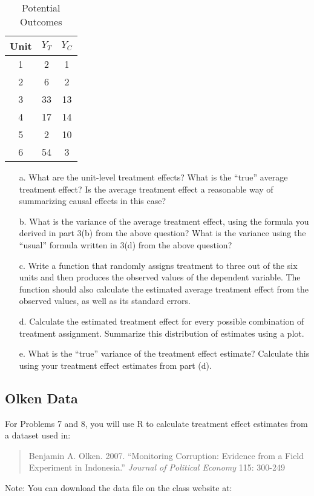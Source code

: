 \documentclass{article}
\begin{document}
\begin{table}[!h]
		\caption{Potential Outcomes}
	\begin{center}
		\begin{tabular}{ccc}
			Unit & $Y_T$ & $Y_C$ \\ \hline  
			1    & 2     & 1     \\ 
			2    & 6     & 2     \\ 
			3    & 33    & 13    \\ 
			4    & 17    & 14    \\ 
			5   &  2     &  10     \\ 
			 6  & 54    &  3 \\     
		\end{tabular}
		\label{}
	\end{center}
\end{table}


\begin{itemize}
\item[a.] What are the unit-level treatment effects? What is the ``true''
  average treatment effect? Is the average treatment effect a reasonable way
  of summarizing causal effects in this case? 
\item[b.]   What is the variance of the average treatment effect, using
  the formula you derived in part 3(b) from the above question? What is
  the variance using the ``usual'' formula written in 3(d) from the
  above question?
  \item[c.] Write a function that randomly assigns treatment to three out of
  the six units and then  produces the observed values of the dependent
  variable. The function should also calculate the estimated average
  treatment effect from the observed values, as well as its standard
  errors.
\item[d.] Calculate the estimated treatment effect for
  every possible combination of treatment assignment. Summarize this distribution of estimates using a plot.
\item[e.] What is the ``true'' variance of the treatment effect estimate? Calculate this using your treatment effect estimates from part (d).
\end{itemize}

\subsection*{Olken Data}
For Problems 7 and 8, you will use R to calculate
treatment effect estimates from a dataset used in:
\begin{quote}
  Benjamin A. Olken. 2007. ``Monitoring Corruption: Evidence from a
  Field Experiment in Indonesia.'' \textit{Journal of Political
    Economy} 115: 300-249
\end{quote}
Note: You can download the data file on the class website at:
\end{document}
